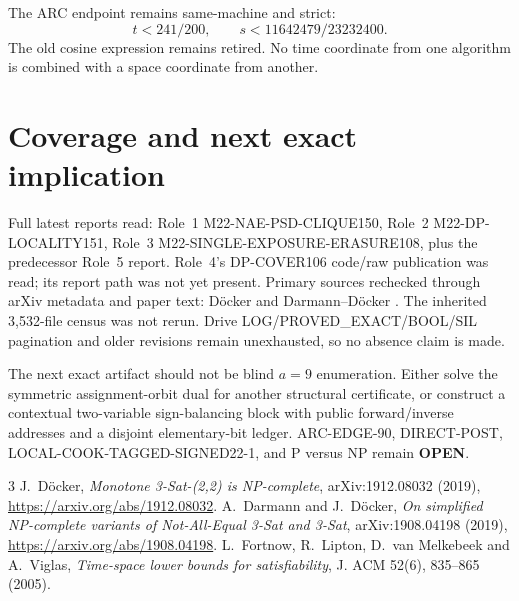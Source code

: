 \documentclass[11pt]{article}
\begin{document}
The ARC endpoint remains same-machine and strict:
\[
 t<241/200,\qquad s<11642479/23232400.
\]
The old cosine expression remains retired.  No time coordinate from one algorithm is combined with a space coordinate from another.

\section{Coverage and next exact implication}
Full latest reports read: Role~1 M22-NAE-PSD-CLIQUE150, Role~2 M22-DP-LOCALITY151, Role~3 M22-SINGLE-EXPOSURE-ERASURE108, plus the predecessor Role~5 report.  Role~4's DP-COVER106 code/raw publication was read; its report path was not yet present.  Primary sources rechecked through arXiv metadata and paper text: D\"ocker \cite{docker} and Darmann--D\"ocker \cite{dd}.  The inherited 3,532-file census was not rerun.  Drive LOG/PROVED\_EXACT/BOOL/SIL pagination and older revisions remain unexhausted, so no absence claim is made.

The next exact artifact should not be blind $a=9$ enumeration.  Either solve the symmetric assignment-orbit dual for another structural certificate, or construct a contextual two-variable sign-balancing block with public forward/inverse addresses and a disjoint elementary-bit ledger.  ARC-EDGE-90, DIRECT-POST, LOCAL-COOK-TAGGED-SIGNED22-1, and P versus NP remain \textbf{OPEN}.

\begin{thebibliography}{3}
 J.~D\"ocker, \emph{Monotone 3-Sat-(2,2) is NP-complete}, arXiv:1912.08032 (2019), \url{https://arxiv.org/abs/1912.08032}.
 A.~Darmann and J.~D\"ocker, \emph{On simplified NP-complete variants of Not-All-Equal 3-Sat and 3-Sat}, arXiv:1908.04198 (2019), \url{https://arxiv.org/abs/1908.04198}.
 L.~Fortnow, R.~Lipton, D.~van Melkebeek and A.~Viglas, \emph{Time-space lower bounds for satisfiability}, J. ACM 52(6), 835--865 (2005).
\end{thebibliography}
\end{document}
